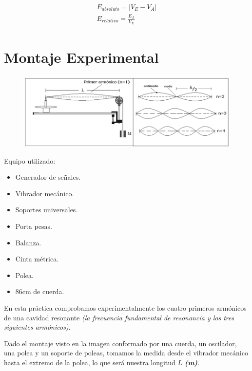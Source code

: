 \documentclass[twocolumn, 12pt]{article}
\newcommand{\bolditalic}[1]{\textbf{\textit{#1}}}
\begin{document}
{\large
    \begin{equation}
        \begin{gathered}
            E_{absoluto} = \left\lvert V_E - V_A\right\rvert \\
            E_{relativo} = \frac{E_A}{V_E} \\
        \end{gathered}
        \label{eq:calculo-errores}
    \end{equation}
}

\section{Montaje Experimental}

\begin{figure}[H]
    \includegraphics[width=\linewidth]{./Images/Imagen1.png}
    \caption{}
\end{figure}

Equipo utilizado:

\begin{itemize}[label=$\triangleright$]
    \item Generador de señales.
    \item Vibrador mecánico.
    \item Soportes universales.
    \item Porta pesas.
    \item Balanza.
    \item Cinta métrica.
    \item Polea.
    \item 86cm de cuerda.
\end{itemize}

En esta práctica comprobamos experimentalmente los cuatro
primeros armónicos de una cavidad resonante \textit{(la
    frecuencia fundamental de resonancia y los tres siguientes
    armónicos)}.

Dado el montaje visto en la imagen conformado por una
cuerda, un oscilador, una polea y un soporte de poleas,
tomamos la medida desde el vibrador mecánico hasta el
extremo de la polea, lo que será nuestra longitud $L$
\bolditalic{(m)}.
\end{document}
